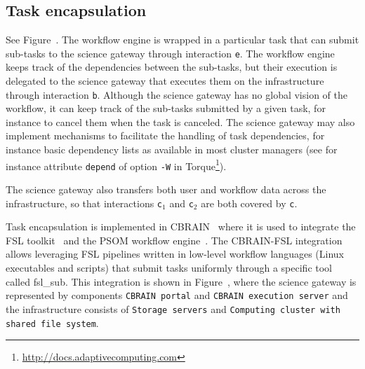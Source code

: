 \documentclass[preprint,3p,twocolumn]{elsarticle}
\newcommand{\note}[2]{\pdfmargincomment[color=yellow,author=#1,open=true]{#2}}
\newcommand{\closednote}[4]{} %
\begin{document}
\subsection{Task encapsulation}
\closednote{Marc-e}{May I propose
  another name here? Either "Task-centric" or "Task Oriented". My
  reasoning is that the WE is just another task, as well as the
  sub-tasks themselves.}{Tristan}{I agree: sub-tasking is not the
  integration model, it is the process that engines use when they
  are integrated as tasks. I think 'task encapsulation' is more
  consistent  with 'service invocation' than 'task-oriented'}

See Figure~. The workflow engine is wrapped in
a particular task that can submit sub-tasks to the science gateway
through interaction \texttt{e}. The workflow engine keeps track of the
dependencies between the sub-tasks, but their execution is delegated
to the science gateway that executes them on the infrastructure
through interaction \texttt{b}. Although the science gateway has no
global vision of the workflow, it can keep track of the sub-tasks
submitted by a given task, for instance to cancel them when
the task is canceled. The science gateway may also implement
mechanisms to facilitate the handling of task dependencies, for
instance basic dependency lists as available in most cluster managers
(see for instance attribute \texttt{depend} of option \texttt{-W} in
Torque\footnote{\url{http://docs.adaptivecomputing.com}}).

The science gateway also transfers both user and workflow data across
the infrastructure, so that interactions \texttt{c$_1$} and
\texttt{c$_2$} are both covered by \texttt{c}. 
\closednote{Sil}{is this next sentence relevant?}{Tristan}{I just wanted to  justify why these two interactions can be grouped but I guess you're right (I removed the sentence.}%

Task encapsulation is implemented in CBRAIN~\cite{SHER-14} where it is
used to integrate the FSL toolkit~\cite{Jenkinson2012782} and the PSOM
workflow engine~\cite{bellec2012pipeline}. The CBRAIN-FSL integration
allows leveraging FSL pipelines written in low-level workflow
languages (Linux executables and scripts) that submit tasks uniformly
through a specific tool called fsl\_sub. This integration is shown in
Figure~, where the science gateway is
represented by components \texttt{CBRAIN portal} and \texttt{CBRAIN
  execution server} and the infrastructure consists of \texttt{Storage
  servers} and \texttt{Computing cluster with shared file system}.
\end{document}
